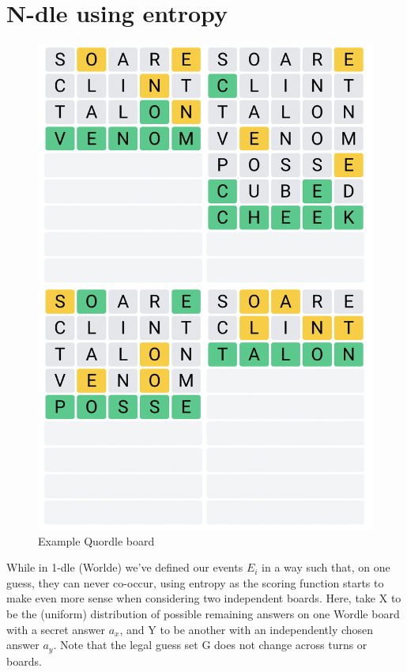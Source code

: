 \documentclass[11pt, oneside]{article} 	%
\begin{document}
\section{N-dle using entropy}

\begin{figure}[!htb]
\centering
\includegraphics[scale=.3]{quordle}
\caption{Example Quordle board}
\end{figure}


While in 1-dle (Worlde) we've defined our events $E_i$ in a way such that, on one guess, they can never co-occur, using entropy as the scoring function starts to make even more sense when considering two independent boards. Here, take X to be the (uniform) distribution of possible remaining answers on one Wordle board with a secret answer $a_x$, and Y to be another with an independently chosen answer $a_y$. Note that the legal guess set G does not change across turns or boards.
\end{document}
